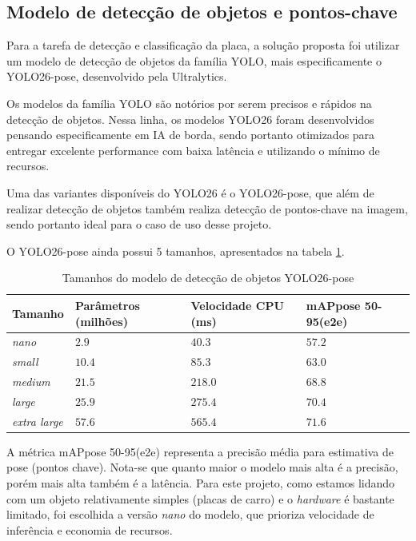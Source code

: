 \subsection{Modelo de detecção de objetos e pontos-chave}

Para a tarefa de detecção e classificação da placa, a solução proposta foi utilizar um modelo de detecção de objetos da família YOLO, mais especificamente o YOLO26-pose, desenvolvido pela Ultralytics.

Os modelos da família YOLO são notórios por serem precisos e rápidos na detecção de objetos. Nessa linha, os modelos YOLO26 foram desenvolvidos pensando especificamente em IA de borda, sendo portanto otimizados para entregar excelente performance com baixa latência e utilizando o mínimo de recursos.

Uma das variantes disponíveis do YOLO26 é o YOLO26-pose, que além de realizar detecção de objetos também realiza detecção de pontos-chave na imagem, sendo portanto ideal para o caso de uso desse projeto.

O YOLO26-pose ainda possui 5 tamanhos, apresentados na tabela \ref{tab:yolo26_table}.

\begin{table}[H]
    \centering
    \begin{tabular}{| m{3cm} | m{3cm} | m{3cm} | m{3cm} |}
        \hline
        Tamanho & Parâmetros (milhões) & Velocidade CPU (ms) & mAPpose 50-95(e2e) \\
        \hline \hline
        \textit{nano} & $2.9$ & $40.3$ & $57.2$ \\
        \hline
        \textit{small} & $10.4$ & $85.3$ & $63.0$ \\
        \hline
        \textit{medium} & $21.5$ & $218.0$ & $68.8$ \\
        \hline
        \textit{large} & $25.9$ & $275.4$ & $70.4$ \\
        \hline
        \textit{extra large} & $57.6$ & $565.4$ & $71.6$ \\
        \hline
    \end{tabular}
    \caption{Tamanhos do modelo de detecção de objetos YOLO26-pose}
    \label{tab:yolo26_table}
\end{table}

A métrica mAPpose 50-95(e2e) representa a precisão média para estimativa de pose (pontos chave). Nota-se que quanto maior o modelo mais alta é a precisão, porém mais alta também é a latência. Para este projeto, como estamos lidando com um objeto relativamente simples (placas de carro) e o \textit{hardware} é bastante limitado, foi escolhida a versão \textit{nano} do modelo, que prioriza velocidade de inferência e economia de recursos.

